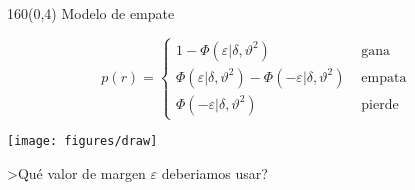 \documentclass[shownotes,aspectratio=169]{beamer}
\begin{document}
\begin{frame}[plain]
 \begin{textblock}{160}(0,4)
  \centering \Large Modelo de empate
 \end{textblock}
\vspace{1.25cm}
 
 \begin{equation*}
  p(r) = 
  \begin{cases}
   1 - \Phi(\varepsilon| \delta, \vartheta^2) & \text{ gana } \\
   \Phi(\varepsilon| \delta, \vartheta^2) - \Phi(-\varepsilon| \delta, \vartheta^2) & \text{ empata } \\
   \Phi(-\varepsilon| \delta, \vartheta^2) & \text{ pierde }
  \end{cases}
 \end{equation*}

 \vspace{0.5cm}

 \centering
\texttt{[image: figures/draw]}

 
\end{frame}


\begin{frame}[plain]
 \centering \Large \vspace{1cm}
 
 >Qu\'e valor de margen $\varepsilon$ deberiamos usar?

\end{frame}
\end{document}
